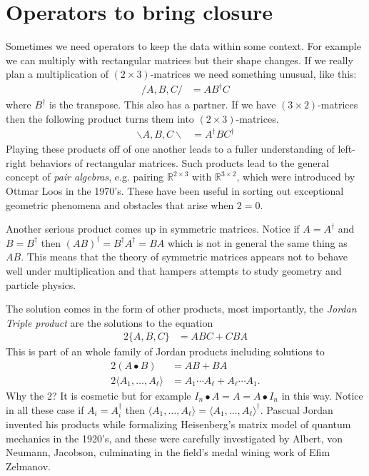 \section{Operators to bring closure}
Sometimes we need operators to keep the data within some context.
For example we can multiply with rectangular matrices but their shape changes.
If we really plan a multiplication of $(2\times 3)$-matrices we need 
something unusual, like this:
\begin{align*}
    /A,B,C/ & = AB^{\dagger}C
\end{align*}
where $B^{\dagger}$ is the transpose.  This also has a partner.  If we have
$(3\times 2)$-matrices then the following product turns them into $(2\times 3)$-matrices.
\begin{align*}
    \backslash A,B,C\backslash & = A^{\dagger} B C^{\dagger}
\end{align*}
Playing these products off of one another leads to a fuller understanding of left-right 
behaviors of rectangular matrices.
Such products lead to the general 
concept of \emph{pair algebras}, e.g. pairing $\mathbb{R}^{2\times 3}$ 
with $\mathbb{R}^{3\times 2}$, which were introduced by Ottmar Loos in the 1970's.
  These have been useful in sorting out exceptional geometric 
phenomena and obstacles that arise when $2=0$.


Another serious product comes up 
in symmetric matrices.  Notice if $A=A^{\dagger}$ and $B=B^{\dagger}$
then $(AB)^{\dagger}=B^{\dagger}A^{\dagger}=BA$ which is not in general 
the same thing as $AB$.  This means that the theory of symmetric matrices 
appears not to behave well under multiplication and that hampers attempts 
to study geometry and particle physics.

The solution comes in the form of other products, most importantly, 
the  \emph{Jordan Triple product} are the solutions to the equation
\begin{align*}
    2\{A,B,C\} & = ABC+CBA
\end{align*}
This is part of an whole family of Jordan products including solutions to
\begin{align*}
    2(A\bullet B) & = AB+BA\\
    2\langle A_1,\ldots,A_{\ell}\rangle & = A_1\cdots A_{\ell}+A_{\ell}\cdots A_1.
\end{align*}
Why the 2?  It is cosmetic but for example $I_n\bullet A=A=A\bullet I_n$ in this way. 
Notice in all these case if $A_i=A_i^{\dagger}$ then $\langle A_1,\ldots,A_{\ell}\rangle=
\langle A_1,\ldots,A_{\ell}\rangle^{\dagger}$. 
Pascual Jordan invented his products while formalizing 
Heisenberg's matrix model of quantum mechanics in the 1920's, and these were 
carefully investigated by Albert, von Neumann, Jacobson, culminating in the 
field's medal wining work of Efim Zelmanov.



